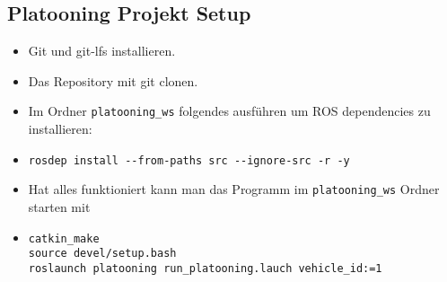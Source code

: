 \documentclass[a4paper, 12pt, titlepage]{scrartcl}
\begin{document}
	\subsection{Platooning Projekt Setup}
	\begin{itemize}
		\item Git und git-lfs installieren.
		\item Das Repository mit git clonen.
		\item Im Ordner \texttt{platooning\_ws} folgendes ausführen um ROS dependencies zu installieren:
		\item[] \begin{lstlisting}
rosdep install --from-paths src --ignore-src -r -y
		\end{lstlisting}
		\item Hat alles funktioniert kann man das Programm im \texttt{platooning\_ws} Ordner starten mit
		\item[] \begin{lstlisting}
catkin_make
source devel/setup.bash
roslaunch platooning run_platooning.lauch vehicle_id:=1
		\end{lstlisting}
	\end{itemize}
\end{document}
